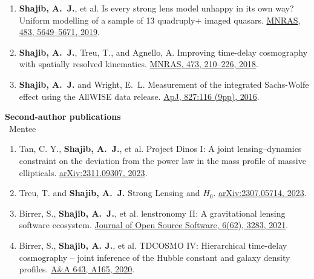 \documentclass[margin, line]{res}
\begin{document}
\begin{resume}
\begin{enumerate}
	\item \textbf{Shajib, A.~J.}, et al. Is every strong lens model unhappy in its own way? Uniform modelling of a sample of 13 quadruply+ imaged quasars. \href{https://doi.org/10.1093/mnras/sty3397}{MNRAS, 483, 5649--5671, 2019}.
	\item \textbf{Shajib, A.~J.}, Treu, T., and Agnello, A. Improving time-delay cosmography with spatially resolved kinematics. \href{https://doi.org/10.1093/mnras/stx2302}{MNRAS, 473, 210--226, 2018}.
	\item \textbf{Shajib, A.~J.} and Wright, E.~L. Measurement of the integrated Sachs-Wolfe effect using the AllWISE data release. \href{http://dx.doi.org/10.3847/0004-637X/827/2/116}{ApJ, 827:116 (9pp), 2016}.
\end{enumerate}


\textbf{Second-author publications}
\\ \mentee\ Mentee
\begin{enumerate}
	\item Tan, C. Y.{\mentee}, \textbf{Shajib, A.~J.}, et al. Project Dinos I: A joint lensing--dynamics constraint on the deviation from the power law in the mass profile of massive ellipticals. \href{https://ui.adsabs.harvard.edu/abs/2023arXiv231109307T/abstract}{arXiv:2311.09307, 2023}.
	\item Treu, T. and \textbf{Shajib, A.~J.} Strong Lensing and $H_0$. \href{https://arxiv.org/abs/2307.05714}{arXiv:2307.05714, 2023}.
	\item Birrer, S., \textbf{Shajib, A.~J.}, et al. lenstronomy II: A gravitational lensing software ecosystem. \href{https://joss.theoj.org/papers/10.21105/joss.03283}{Journal of Open Source Software, 6(62), 3283, 2021}.
	\item Birrer, S., \textbf{Shajib, A. J.}, et al. TDCOSMO IV: Hierarchical time-delay cosmography -- joint inference of the Hubble constant and galaxy density profiles. \href{https://doi.org/10.1051/0004-6361/202038861}{A\&A 643, A165, 2020}.
\end{enumerate}


\end{resume}
\end{document}
